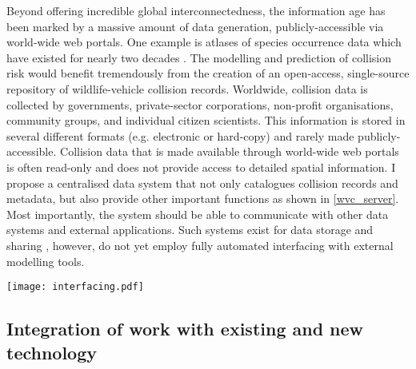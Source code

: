 Beyond offering incredible global interconnectedness, the information age has been marked by a massive amount of data generation, publicly-accessible via world-wide web portals. One example is atlases of species occurrence data which have existed for nearly two decades \citep{}. The modelling and prediction of collision risk would benefit tremendously from the creation of an open-access, single-source repository of wildlife-vehicle collision records. Worldwide, collision data is collected by governments, private-sector corporations, non-profit organisations, community groups, and individual citizen scientists. This information is stored in several different formats (e.g. electronic or hard-copy) and rarely made publicly-accessible. Collision data that is made available through world-wide web portals is often read-only and does not provide access to detailed spatial information. I propose a centralised data system that not only catalogues collision records and metadata, but also provide other important functions as shown in \cref{wvc_server}. Most importantly, the system should be able to communicate with other data systems and external applications. Such systems exist for data storage and sharing \citep{}, however, do not yet employ fully automated interfacing with external modelling tools.

\begin{figure*}[htp]
  \centering
  \texttt{[image: interfacing.pdf]}
  \caption[Centralised data collection and reporting system]{Schematic diagram of centralised data collection and reporting system for wildlife-vehicle collisions. Arrows indicate directions of information flow. Additional collection of collisions data (in blue) is by both citizen scientists (top) and professionals (bottom).}
  \label{wvc_server}
\end{figure*}


\subsection{Integration of work with existing and new technology}

